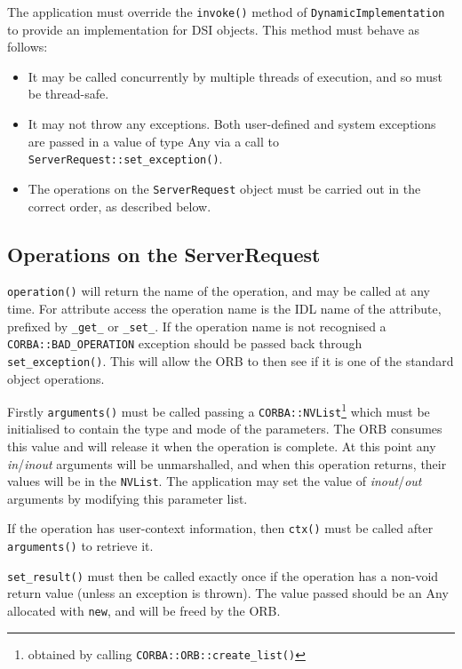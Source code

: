 \documentclass[11pt,twoside,a4paper]{book}
\newcommand{\type}[1]{\texttt{#1}}
\newcommand{\code}[1]{\texttt{#1}}
\newcommand{\op}[1]{\texttt{#1()}}
\newcommand{\dsc}{\discretionary{}{}{}}
\begin{document}
The application must override the \op{invoke} method of
\type{DynamicImplementation} to provide an implementation for DSI
objects.  This method must behave as follows:

\begin{itemize}
\item It may be called concurrently by multiple threads of execution,
and so must be thread-safe.

\item It may not throw any exceptions. Both user-defined and system
exceptions are passed in a value of type Any via a call to
\op{ServerRequest::set\_\dsc{}exception}.

\item The operations on the \type{ServerRequest} object must be
carried out in the correct order, as described below.
\end{itemize}


\subsection{Operations on the ServerRequest}

\op{operation} will return the name of the operation, and may be
called at any time. For attribute access the operation name is the IDL
name of the attribute, prefixed by \texttt{\_get\_} or
\texttt{\_set\_}. If the operation name is not recognised a
\code{CORBA::\dsc{}BAD\_OPERATION} exception should be passed back
through \op{set\_exception}. This will allow the ORB to then see if it
is one of the standard object operations.

Firstly \op{arguments} must be called passing a
\type{CORBA::NVList}\footnote{obtained by calling
\op{CORBA::ORB::create\_list}} which must be initialised to contain
the type and mode of the parameters.  The ORB consumes this value and
will release it when the operation is complete. At this point any
\emph{in}/\emph{inout} arguments will be unmarshalled, and when this
operation returns, their values will be in the \type{NVList}. The
application may set the value of \emph{inout}/\emph{out} arguments by
modifying this parameter list.

If the operation has user-context information, then \op{ctx} must be
called after \op{arguments} to retrieve it.

\op{set\_result} must then be called exactly once if the operation has
a non-void return value (unless an exception is thrown). The value
passed should be an Any allocated with \code{new}, and will be freed
by the ORB.
\end{document}
